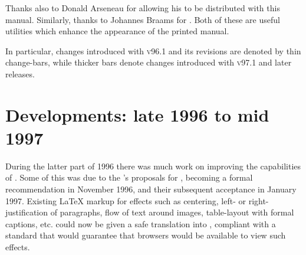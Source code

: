 \latex{\bigskip}\htmlrule

%
\noindent
Thanks also to Donald Arseneau  for allowing his 
to be distributed with this manual.
Similarly, thanks to Johannes Braams  for .
%
\html{\\}
Both of these are useful utilities which enhance the appearance of the printed manual.
\begin{latexonly}
In particular, changes introduced with  \textsc{v96.1} and its revisions are denoted
by thin change-bars, while thicker bars denote changes introduced with  \textsc{v97.1}
and later releases.%
\end{latexonly}



\clearpage
\section*{Developments: late 1996 to mid 1997\label{recent97}}%
%
During the latter part of 1996 there was much work on improving the
capabilities of \latextohtml.
Some of this was due to the \WiiiC's proposals for \HTMLiii,
becoming a formal recommendation in November 1996,
and their subsequent acceptance in January 1997.
Existing \LaTeX{} markup for effects such as centering, left-
or right-justification of paragraphs,
flow of text around images, table-layout with formal captions, etc.
could now be given a safe translation into \HTMLiii, compliant with a standard
that would guarantee that browsers would be available to view such effects.

